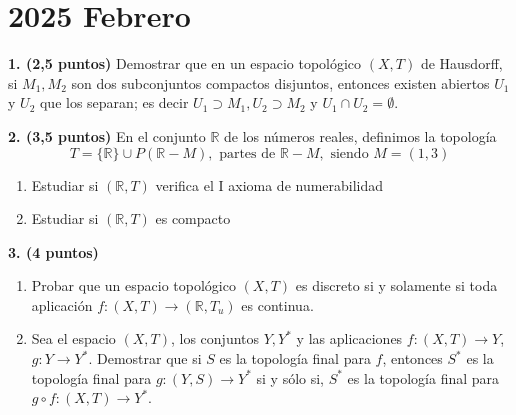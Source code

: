 \clearpage
\chapter*{2025 Febrero}

\begin{enunciado}
    \hypertarget{2025 B 1}{}
    \textbf{1. (2,5 puntos)} Demostrar que en un espacio topológico \((X,T)\) de Hausdorff, si \(M_1,M_2\) son dos subconjuntos compactos disjuntos, entonces existen abiertos \(U_1\) y \(U_2\) que los separan; es decir \(U_1 \supset M_1, U_2 \supset M_2\) y \(U_1 \cap U_2 = \emptyset\).
\end{enunciado}

\begin{enunciado}
    \hypertarget{2025 B 2}{}
    \textbf{2. (3,5 puntos)} En el conjunto \(\mathbb{R}\) de los números reales, definimos la topología
    \[
        T = \{\mathbb{R}\} \cup P(\mathbb{R} - M), \text{ partes de } \mathbb{R} - M, \text{ siendo } M = (1,3)
    \]
    \begin{enumerate}[label=\alph*)]
        \item Estudiar si \((\mathbb{R},T)\) verifica el I axioma de numerabilidad
        \item Estudiar si \((\mathbb{R},T)\) es compacto
    \end{enumerate}
\end{enunciado}

\begin{enunciado}
    \hypertarget{2025 B 3}{}
    \textbf{3. (4 puntos)}
    \begin{enumerate}[label=\alph*)]
        \item Probar que un espacio topológico \((X,T)\) es discreto si y solamente si toda aplicación \(f : (X,T) \to (\mathbb{R},T_u)\) es continua.
        \item Sea el espacio \((X,T)\), los conjuntos \(Y,Y^*\) y las aplicaciones \(f : (X,T) \to Y\), \(g : Y \to Y^*\). Demostrar que si \(S\) es la topología final para \(f\), entonces \(S^*\) es la topología final para \(g : (Y,S) \to Y^*\) si y sólo si, \(S^*\) es la topología final para \(g \circ f : (X,T) \to Y^*\).
    \end{enumerate}
\end{enunciado}

